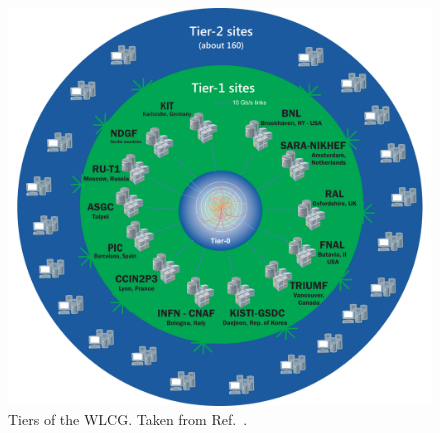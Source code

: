 \begin{figure}[hbtp]
  \begin{center}
    \includegraphics[width=0.7\linewidth]{img/detector/wlcg.png}
    \caption{
        Tiers of the WLCG. Taken from Ref.~\cite{wlcgwebsite}.
        }
    \label{fig:wlcg}
  \end{center}
\end{figure}

